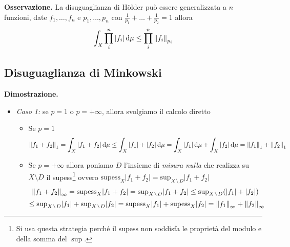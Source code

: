 \textbf{Osservazione.}
La disuguaglianza di H\"older può essere generalizzata a $n$ funzioni, date $f_1, \dots, f_n$ e $p_1, \dots, p_n$ con $\frac{1}{p_1} + \dots + \frac{1}{p_2} = 1$ allora
$$
\int_X \prod_i^n |f_i| \,\mathrm{d} \mu \leq \prod_i^n \left\lVert f_i \right\rVert_{p_i} 
$$

\subsection{Disuguaglianza di Minkowski}

%
\textbf{Dimostrazione.}
\begin{itemize}
	\item \textit{Caso 1:} se $p = 1$ o $p = +\infty$, allora svolgiamo il calcolo diretto
		
		\begin{itemize}
			\item Se $p = 1$
				$$
				\left\lVert f_1 + f_2 \right\rVert_1 
				= \int_X |f_1 + f_2| \,\mathrm{d} \mu 
				\leq \int_X |f_1| + |f_2| \,\mathrm{d} \mu 
				= \int_X |f_1| \,\mathrm{d} \mu + \int_X |f_2| \,\mathrm{d} \mu
				= \left\lVert f_1 \right\rVert_1 + \left\lVert f_2 \right\rVert_1
				$$
			\item Se $p = +\infty$ allora poniamo $D$ l'insieme di \textit{misura nulla} che realizza su $X \setminus D$ il supess\footnote{Si usa questa strategia perché il $\mathrm{supess}$ non soddisfa le proprietà del modulo e della somma del $\sup$.} ovvero $\mathrm{supess}_X |f_1 + f_2| = \mathrm{sup}_{X \,\setminus\, D} |f_1 + f_2|$
				$$
				\norm{f_1 + f_2}_\infty
				= \mathrm{supess}_X |f_1 + f_2| 
				= \mathrm{sup}_{X \,\setminus\, D} |f_1 + f_2| 
				\leq \mathrm{sup}_{X \,\setminus\, D} (|f_1| + |f_2|)
				$$
				$$
				\leq \mathrm{sup}_{X \,\setminus\, D} |f_1| + \mathrm{sup}_{X \,\setminus\, D} |f_2|
				= \mathrm{supess}_X |f_1| + \mathrm{supess}_X |f_2|
				= \norm{f_1}_\infty + \norm{f_2}_\infty
				$$
		\end{itemize}


\end{itemize}
